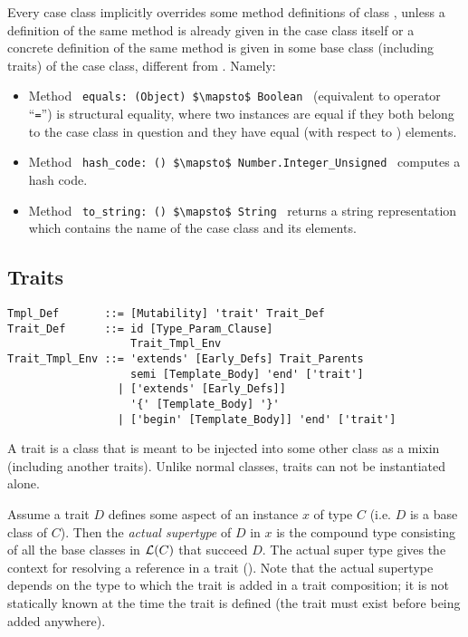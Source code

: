 Every case class implicitly overrides some method definitions of class , unless a definition of the same method is already given in the case class itself or a concrete definition of the same method is given in some base class (including traits) of the case class, different from . Namely: 
\begin{itemize}
  \item[] Method ~\lstinline!equals: (Object) $\mapsto$ Boolean!~ (equivalent to operator ``\lstinline!=!'') is structural equality, where two instances are equal if they both belong to the case class in question and they have equal (with respect to ) elements. 

  \item[] Method ~\lstinline!hash_code: () $\mapsto$ Number.Integer_Unsigned!~ computes a hash code. 

  \item[] Method ~\lstinline!to_string: () $\mapsto$ String!~ returns a string representation which contains the name of the case class and its elements. 
\end{itemize}






\subsection{Traits}
\label{sec:traits}

\syntax\begin{lstlisting}
Tmpl_Def       ::= [Mutability] 'trait' Trait_Def
Trait_Def      ::= id [Type_Param_Clause] 
                   Trait_Tmpl_Env
Trait_Tmpl_Env ::= 'extends' [Early_Defs] Trait_Parents
                   semi [Template_Body] 'end' ['trait']
                 | ['extends' [Early_Defs]] 
                   '{' [Template_Body] '}'
                 | ['begin' [Template_Body]] 'end' ['trait']
\end{lstlisting}

A trait is a class that is meant to be injected into some other class as a mixin (including another traits). Unlike normal classes, traits can not be instantiated alone. 

Assume a trait $D$ defines some aspect of an instance $x$ of type $C$ (i.e. $D$ is a base class of $C$). Then the {\em actual supertype} of $D$ in $x$ is the compound type consisting of all the base classes in ${\cal L}(C)$ that succeed $D$. The actual super type gives the context for resolving a  reference in a trait (). Note that the actual supertype depends on the type to which the trait is added in a trait composition; it is not statically known at the time the trait is defined (the trait must exist before being added anywhere). 

